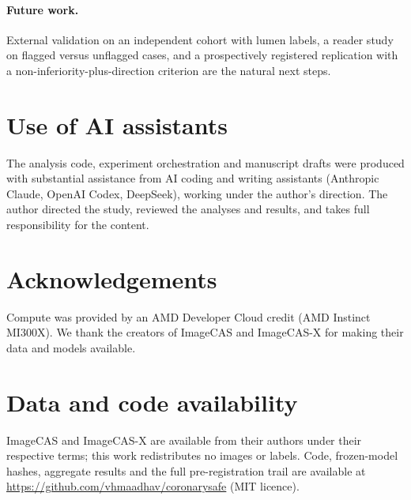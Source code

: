 \documentclass[11pt]{article}
\begin{document}
\paragraph{Future work.} External validation on an independent cohort with lumen labels, a reader study on flagged versus unflagged cases, and a prospectively registered replication with a non-inferiority-plus-direction criterion are the natural next steps.

\section*{Use of AI assistants}
The analysis code, experiment orchestration and manuscript drafts were produced with substantial assistance from AI coding and writing assistants (Anthropic Claude, OpenAI Codex, DeepSeek), working under the author's direction. The author directed the study, reviewed the analyses and results, and takes full responsibility for the content.

\section*{Acknowledgements}
Compute was provided by an AMD Developer Cloud credit (AMD Instinct MI300X). We thank the creators of ImageCAS and ImageCAS-X for making their data and models available.

\section*{Data and code availability}
ImageCAS and ImageCAS-X are available from their authors under their respective terms; this work redistributes no images or labels. Code, frozen-model hashes, aggregate results and the full pre-registration trail are available at \url{https://github.com/vhmaadhav/coronarysafe} (MIT licence).



\end{document}
